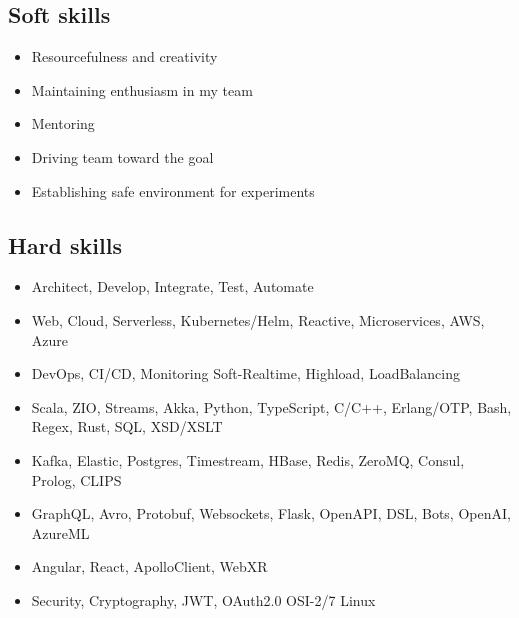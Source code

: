 
\subsection*{Soft skills}

\begin{itemize}[noitemsep, nosep]
  \item Resourcefulness and creativity
  \item Maintaining enthusiasm in my team
  \item Mentoring
  \item Driving team toward the goal
  \item Establishing safe environment for experiments
\end{itemize}

\subsection*{Hard skills}

\begin{itemize}[noitemsep, nosep]
  \item Architect, Develop, Integrate, Test, Automate
  \item Web, Cloud, Serverless, Kubernetes/Helm, Reactive, Microservices, AWS, Azure
  \item DevOps, CI/CD, Monitoring \textbar{} Soft-Realtime, Highload, LoadBalancing
  \item Scala, ZIO, Streams, Akka, Python, TypeScript, C/C++, Erlang/OTP, Bash, Regex, Rust, SQL, XSD/XSLT
  \item Kafka, Elastic, Postgres, Timestream, HBase, Redis, ZeroMQ, Consul, Prolog, CLIPS
  \item GraphQL, Avro, Protobuf, Websockets, Flask, OpenAPI, DSL, Bots, OpenAI, AzureML
  \item Angular, React, ApolloClient, WebXR
  \item Security, Cryptography, JWT, OAuth2.0 \textbar{} OSI-2/7 \textbar{} Linux
\end{itemize}